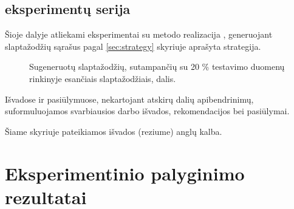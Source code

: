 \documentclass{VUMIFInfBakalaurinis}
\begin{document}
\subsection{ eksperimentų serija}
Šioje dalyje atliekami eksperimentai su  metodo realizacija 
\cite{PCFG:impl}, generuojant slaptažodžių sąrašus pagal \ref{sec:strategy} 
skyriuje aprašyta strategija.

\begin{figure}[!ht]
  \begin{center}
  \end{center}
  \caption{
    Sugeneruotų slaptažodžių, sutampančių su 20 \% testavimo duomenų rinkinyje 
    esančiais slaptažodžiais, dalis.
  }
  \label{plot:kazkoks}
\end{figure}

Išvadose ir pasiūlymuose, nekartojant atskirų dalių apibendrinimų,
suformuluojamos svarbiausios darbo išvados, rekomendacijos bei pasiūlymai.

Šiame skyriuje pateikiamos išvados (reziume) anglų kalba.

\printbibliography[heading=bibintoc]

\appendix  %


\section{Eksperimentinio palyginimo rezultatai}
\end{document}
